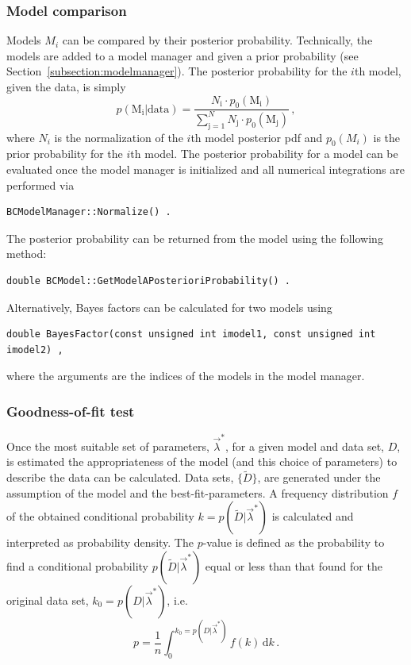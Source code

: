 \documentclass[11pt, a4paper]{article}
\begin{document}
\subsubsection{Model comparison}

Models $M_{i}$ can be compared by their posterior
probability. Technically, the models are added to a model manager and
given a prior probability (see
Section~\ref{subsection:modelmanager}). The posterior probability for
the $i$th model, given the data, is simply
%
\begin{equation}
p(\mathrm{M_{i}}|\mathrm{data}) = \frac{N_{\mathrm{i}} \cdot p_{0}(\mathrm{M_{i}})}{\sum_{\mathrm{j} = 1}^{N} N_{\mathrm{j}} \cdot p_{0}(\mathrm{M_{j}})} \, ,
\end{equation}
%
where $N_{i}$ is the normalization of the $i$th model posterior pdf
and $p_{0}(M_{i})$ is the prior probability for the $i$th model. The
posterior probability for a model can be evaluated once the model
manager is initialized and all numerical integrations are performed
via
%
\begin{verbatim}
BCModelManager::Normalize() .
\end{verbatim}
%
The posterior probability can be returned from the model using the
following method:
%
\begin{verbatim}
double BCModel::GetModelAPosterioriProbability() .
\end{verbatim}

\noindent 
Alternatively, Bayes factors can be calculated for two models using
%
\begin{verbatim}
double BayesFactor(const unsigned int imodel1, const unsigned int imodel2) ,
\end{verbatim}
%
\noindent
where the arguments are the indices of the models in the model
manager.



\subsubsection{Goodness-of-fit test}

Once the most suitable set of parameters, $\vec{\lambda}^{*}$, for a
given model and data set, $D$, is estimated the appropriateness of the
model (and this choice of parameters) to describe the data can be
calculated. Data sets, $\{ \tilde{D} \}$, are generated under the
assumption of the model and the best-fit-parameters. A frequency
distribution $f$ of the obtained conditional probability
$k=p(\tilde{D}|\vec{\lambda}^{*})$ is calculated and interpreted as
probability density. The $p$-value is defined as the probability to
find a conditional probability $p(\tilde{D}|\vec{\lambda}^{*})$ equal
or less than that found for the original data set,
$k_{0}=p(D|\vec{\lambda}^{*})$, i.e.
%
\begin{equation}
p = \frac{1}{n} \int_{0}^{k_{0}=p(D|\vec{\lambda}^{*})} f(k) \, \mathrm{d}k \, .
\end{equation}
\end{document}
